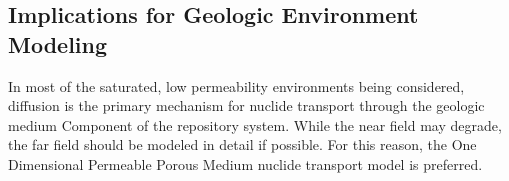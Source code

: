 \subsection{Implications for Geologic Environment Modeling}

In most of the saturated, low permeability environments being considered, 
diffusion is the primary mechanism for nuclide transport through the geologic 
medium Component of the repository system. While the near field may degrade, 
the far field should be modeled in detail if possible. For this reason, the 
One Dimensional Permeable Porous Medium nuclide transport 
model is preferred.
